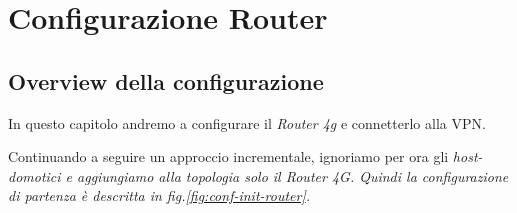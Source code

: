 
\chapter{Configurazione Router}
\label{ch:configurazione-router}

\section{Overview della configurazione}

In questo capitolo andremo a configurare il \textit{Router 4g} e connetterlo alla VPN.

Continuando a seguire un approccio incrementale, ignoriamo per ora gli \it{host-domotici} e aggiungiamo alla topologia solo il \it{Router 4G}. Quindi la configurazione di partenza è descritta in fig.\ref{fig:conf-init-router}.

